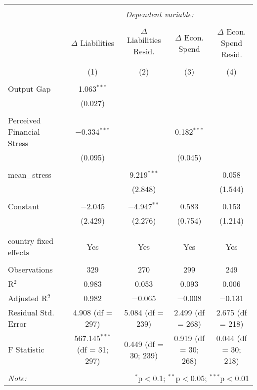 
\begingroup 
\footnotesize 
\begin{tabular}{@{\extracolsep{5pt}}lcccc} 
\\[-1.8ex]\hline 
\hline \\[-1.8ex] 
 & \multicolumn{4}{c}{\textit{Dependent variable:}} \\ 
\cline{2-5} 
\\[-1.8ex] & $\Delta$ Liabilities & $\Delta$ Liabilities Resid. & $\Delta$ Econ. Spend & $\Delta$ Econ. Spend Resid. \\ 
\\[-1.8ex] & (1) & (2) & (3) & (4)\\ 
\hline \\[-1.8ex] 
 Output Gap & 1.063$^{***}$ &  &  &  \\ 
  & (0.027) &  &  &  \\ 
  & & & & \\ 
 Perceived Financial Stress & $-$0.334$^{***}$ &  & 0.182$^{***}$ &  \\ 
  & (0.095) &  & (0.045) &  \\ 
  & & & & \\ 
 mean\_stress &  & 9.219$^{***}$ &  & 0.058 \\ 
  &  & (2.848) &  & (1.544) \\ 
  & & & & \\ 
 Constant & $-$2.045 & $-$4.947$^{**}$ & 0.583 & 0.153 \\ 
  & (2.429) & (2.276) & (0.754) & (1.214) \\ 
  & & & & \\ 
\hline \\[-1.8ex] 
country fixed effects & Yes & Yes & Yes & Yes \\ 
\hline \\[-1.8ex] 
Observations & 329 & 270 & 299 & 249 \\ 
R$^{2}$ & 0.983 & 0.053 & 0.093 & 0.006 \\ 
Adjusted R$^{2}$ & 0.982 & $-$0.065 & $-$0.008 & $-$0.131 \\ 
Residual Std. Error & 4.908 (df = 297) & 5.084 (df = 239) & 2.499 (df = 268) & 2.675 (df = 218) \\ 
F Statistic & 567.145$^{***}$ (df = 31; 297) & 0.449 (df = 30; 239) & 0.919 (df = 30; 268) & 0.044 (df = 30; 218) \\ 
\hline 
\hline \\[-1.8ex] 
\textit{Note:}  & \multicolumn{4}{r}{$^{*}$p$<$0.1; $^{**}$p$<$0.05; $^{***}$p$<$0.01} \\ 
\end{tabular} 
\endgroup 
